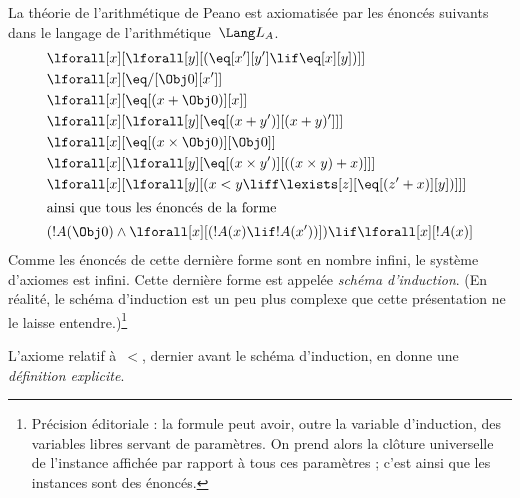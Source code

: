 \documentclass[../../../include/open-logic-section]{subfiles}
\begin{document}
\begin{ex}
La théorie de l'arithmétique de Peano est axiomatisée par les
énoncés suivants dans le langage de l'arithmétique~$\Lang L_A$.
\begin{align*}
& \lforall[x][\lforall[y][(\eq[x'][y'] \lif \eq[x][y])]]\\
& \lforall[x][\eq/[\Obj 0][x']]\\
& \lforall[x][\eq[(x + \Obj 0)][x]]\\
& \lforall[x][\lforall[y][\eq[(x + y')][(x + y)']]]\\
& \lforall[x][\eq[(x \times \Obj 0)][\Obj 0]]\\
& \lforall[x][\lforall[y][\eq[(x \times y')][((x \times y) + x)]]]\\
& \lforall[x][\lforall[y][(x < y \liff \lexists[z][\eq[(z' + x)][y])]]]\\
\intertext{ainsi que tous les énoncés de la forme}
& (!A(\Obj 0) \land \lforall[x][(!A(x) \lif !A(x'))]) \lif \lforall[x][!A(x)]
\end{align*}
Comme les énoncés de cette dernière forme sont en nombre infini,
le système d'axiomes est infini. Cette dernière forme est appelée
\emph{schéma d'induction}. (En réalité, le schéma d'induction est
un peu plus complexe que cette présentation ne le laisse entendre.)\footnote{Précision éditoriale : la formule peut avoir, outre la variable d'induction, des variables libres servant de paramètres. On prend alors la clôture universelle de l'instance affichée par rapport à tous ces paramètres ; c'est ainsi que les instances sont des énoncés.}

L'axiome relatif à~$<$, dernier avant le schéma d'induction, en donne
une \emph{définition explicite}.
\end{ex}
\end{document}
